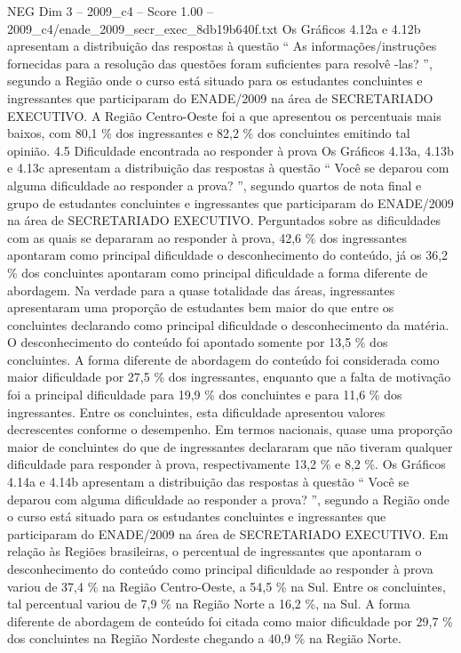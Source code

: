 \begin{textsample}{NEG Dim 3 – 2009\_c4 – Score 1.00 – 2009\_c4/enade\_2009\_secr\_exec\_8db19b640f.txt}
Os Gráficos 4.12a e 4.12b apresentam a distribuição das respostas à questão “ As informações/instruções fornecidas para a resolução das questões foram suficientes para resolvê -las? ”, segundo a Região onde o curso está situado para os estudantes concluintes e ingressantes que participaram do ENADE/2009 na área de SECRETARIADO EXECUTIVO.
A Região Centro-Oeste foi a que apresentou os percentuais mais baixos, com 80,1 \% dos ingressantes e 82,2 \% dos concluintes emitindo tal opinião. 4.5 Dificuldade encontrada ao responder à prova Os Gráficos 4.13a, 4.13b e 4.13c apresentam a distribuição das respostas à questão “ Você se deparou com alguma dificuldade ao responder a prova? ”, segundo quartos de nota final e grupo de estudantes concluintes e ingressantes que participaram do ENADE/2009 na área de SECRETARIADO EXECUTIVO.
Perguntados sobre as dificuldades com as quais se depararam ao responder à prova, 42,6 \% dos ingressantes apontaram como principal dificuldade o desconhecimento do conteúdo, já os 36,2 \% dos concluintes apontaram como principal dificuldade a forma diferente de abordagem.
Na verdade para a quase totalidade das áreas, ingressantes apresentaram uma proporção de estudantes bem maior do que entre os concluintes declarando como principal dificuldade o desconhecimento da matéria.
O desconhecimento do conteúdo foi apontado somente por 13,5 \% dos concluintes.
A forma diferente de abordagem do conteúdo foi considerada como maior dificuldade por 27,5 \% dos ingressantes, enquanto que a falta de motivação foi a principal dificuldade para 19,9 \% dos concluintes e para 11,6 \% dos ingressantes.
Entre os concluintes, esta dificuldade apresentou valores decrescentes conforme o desempenho.
Em termos nacionais, quase uma proporção maior de concluintes do que de ingressantes declararam que não tiveram qualquer dificuldade para responder à prova, respectivamente 13,2 \% e 8,2 \%.
Os Gráficos 4.14a e 4.14b apresentam a distribuição das respostas à questão “ Você se deparou com alguma dificuldade ao responder a prova? ”, segundo a Região onde o curso está situado para os estudantes concluintes e ingressantes que participaram do ENADE/2009 na área de SECRETARIADO EXECUTIVO.
Em relação às Regiões brasileiras, o percentual de ingressantes que apontaram o desconhecimento do conteúdo como principal dificuldade ao responder à prova variou de 37,4 \% na Região Centro-Oeste, a 54,5 \% na Sul.
Entre os concluintes, tal percentual variou de 7,9 \% na Região Norte a 16,2 \%, na Sul.
A forma diferente de abordagem de conteúdo foi citada como maior dificuldade por 29,7 \% dos concluintes na Região Nordeste chegando a 40,9 \% na Região Norte.

\end{textsample}
